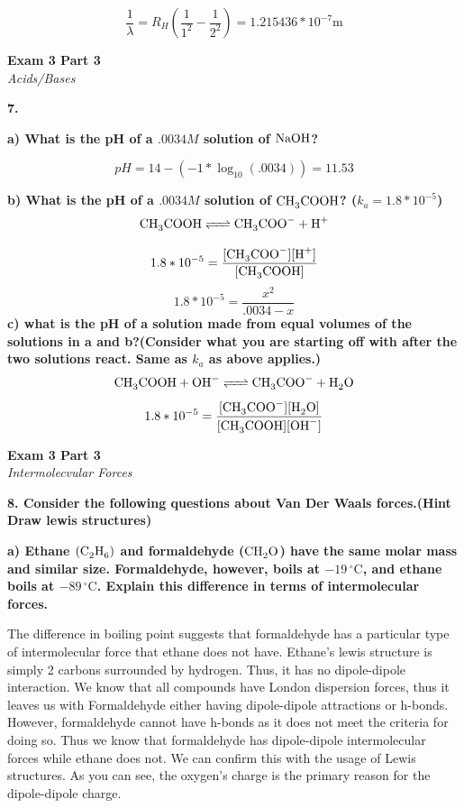 \documentclass{article}
\begin{document}
    $$\dfrac{1}{\lambda} = R_{H}(\dfrac{1}{1^{2}} - \dfrac{1}{2^{2}}) = 1.215436 * 10^{-7} \si{\meter} $$

    \pagebreak

    \begin{center}
        \textbf{Exam 3 Part 3}\\
        \textit{Acids/Bases}
    \end{center}
    \textbf{7.}

    \textbf{a) What is the pH of a $.0034 M$ solution of         $\ce{NaOH}$?}

    $$pH = 14 - (-1 * \log_{10}(.0034)) = 11.53 $$

    \textbf{b) What is the pH of a $.0034 M$ solution of         $\ce{CH3COOH}$? ($k_{a} = 1.8 * 10^{-5}$)}
    $$\ce{CH3COOH <=> CH3COO- + H+}$$

    $$1.8 * 10^{-5} = \dfrac{\ce{[CH3COO^{-}]}{\ce{[H^{+}]}}}{[\ce{CH3COOH}]} $$
    $$1.8 * 10^{-5} = \dfrac{x^{2}}{.0034 - x} $$
    \textbf{c) what is the pH of a solution made from equal volumes of the solutions in a and b?(Consider what you are starting off with after the two solutions react. Same as $k_{a}$ as above applies.)}
    $$\ce{CH3COOH + OH- <=> CH3COO- + H2O}$$
    $$1.8 * 10^{-5} = \dfrac{\ce{[CH3COO^{-}]}{\ce{[H2O]}}}{[\ce{CH3COOH}][\ce{OH^{-}}]} $$


    \pagebreak

    \begin{center}
        \textbf{Exam 3 Part 3}\\
        \textit{Intermolecvular Forces}
    \end{center}
    \textbf{8. Consider the following questions about Van Der Waals forces.(Hint Draw lewis structures)}

    \textbf{a) Ethane $(\ce{C2H6})$ and formaldehyde ($\ce{CH2O}$) have the same molar mass and similar size. Formaldehyde, however, boils at $-19\,^{\circ}\mathrm{C}$, and ethane boils at $-89\,^{\circ}\mathrm{C}$. Explain this difference in terms of intermolecular forces.}

    The difference in boiling point suggests that formaldehyde has a particular type of intermolecular force that ethane does not have. Ethane's lewis structure is simply 2 carbons surrounded by hydrogen. Thus, it has no dipole-dipole interaction. We know that all compounds have London dispersion forces, thus it leaves us with Formaldehyde either having dipole-dipole attractions or h-bonds. However, formaldehyde cannot have h-bonds as it does not meet the criteria for doing so. Thus we know that formaldehyde has dipole-dipole intermolecular forces while ethane does not.  We can confirm this with the usage of Lewis structures. As you can see, the oxygen's charge is the primary reason for the dipole-dipole charge.
\end{document}
